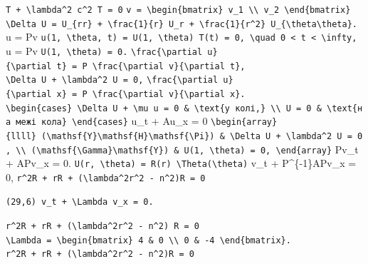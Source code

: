 \documentclass[
  ukrainian,
]{article}
\begin{document}
\texttt{T\textquotesingle{}\textquotesingle{}\ +\ \textbackslash{}lambda\^{}2\ c\^{}2\ T\ =\ 0}
\texttt{v\ =\ \textbackslash{}begin\{bmatrix\}\ v\_1\ \textbackslash{}\textbackslash{}\ v\_2\ \textbackslash{}end\{bmatrix\}}
\texttt{\textbackslash{}Delta\ U\ =\ U\_\{rr\}\ +\ \textbackslash{}frac\{1\}\{r\}\ U\_r\ +\ \textbackslash{}frac\{1\}\{r\^{}2\}\ U\_\{\textbackslash{}theta\textbackslash{}theta\}.}
u = Pv
\texttt{u(1,\ \textbackslash{}theta,\ t)\ =\ U(1,\ \textbackslash{}theta)\ T(t)\ =\ 0,\ \textbackslash{}quad\ 0\ \textless{}\ t\ \textless{}\ \textbackslash{}infty,}
u = Pv \texttt{U(1,\ \textbackslash{}theta)\ =\ 0.}
\texttt{\textbackslash{}frac\{\textbackslash{}partial\ u\}\{\textbackslash{}partial\ t\}\ =\ P\ \textbackslash{}frac\{\textbackslash{}partial\ v\}\{\textbackslash{}partial\ t\},}
\texttt{\textbackslash{}Delta\ U\ +\ \textbackslash{}lambda\^{}2\ U\ =\ 0,}
\texttt{\textbackslash{}frac\{\textbackslash{}partial\ u\}\{\textbackslash{}partial\ x\}\ =\ P\ \textbackslash{}frac\{\textbackslash{}partial\ v\}\{\textbackslash{}partial\ x\}.}
\texttt{\textbackslash{}begin\{cases\}\ \textbackslash{}Delta\ U\ +\ \textbackslash{}mu\ u\ =\ 0\ \&\ \textbackslash{}text\{у\ колі,\}\ \textbackslash{}\textbackslash{}\ U\ =\ 0\ \&\ \textbackslash{}text\{на\ межі\ кола\}\ \textbackslash{}end\{cases\}}
u\_t + Au\_x = 0
\texttt{\textbackslash{}begin\{array\}\{llll\}\ (\textbackslash{}mathsf\{Y\}\textbackslash{}mathsf\{H\}\textbackslash{}mathsf\{\textbackslash{}Pi\})\ \&\ \textbackslash{}Delta\ U\ +\ \textbackslash{}lambda\^{}2\ U\ =\ 0,\ \textbackslash{}\textbackslash{}\ (\textbackslash{}mathsf\{\textbackslash{}Gamma\}\textbackslash{}mathsf\{Y\})\ \&\ U(1,\ \textbackslash{}theta)\ =\ 0,\ \textbackslash{}end\{array\}}
Pv\_t + APv\_x = 0.
\texttt{U(r,\ \textbackslash{}theta)\ =\ R(r)\ \textbackslash{}Theta(\textbackslash{}theta)}
v\_t + P\^{}\{-1\}APv\_x = 0,
\texttt{r\^{}2R\textquotesingle{}\textquotesingle{}\ +\ rR\textquotesingle{}\ +\ (\textbackslash{}lambda\^{}2r\^{}2\ -\ n\^{}2)R\ =\ 0}

\begin{verbatim}
(29,6) v_t + \Lambda v_x = 0.
\end{verbatim}

\texttt{r\^{}2R\textquotesingle{}\textquotesingle{}\ +\ rR\textquotesingle{}\ +\ (\textbackslash{}lambda\^{}2r\^{}2\ -\ n\^{}2)\ R\ =\ 0}
\texttt{\textbackslash{}Lambda\ =\ \textbackslash{}begin\{bmatrix\}\ 4\ \&\ 0\ \textbackslash{}\textbackslash{}\ 0\ \&\ -4\ \textbackslash{}end\{bmatrix\}.}
\texttt{r\^{}2R\textquotesingle{}\textquotesingle{}\ +\ rR\textquotesingle{}\ +\ (\textbackslash{}lambda\^{}2r\^{}2\ -\ n\^{}2)R\ =\ 0}
\end{document}
